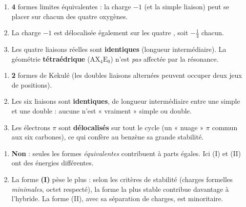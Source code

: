\documentclass[11pt,a4paper]{article}
\begin{document}
\newcommand{\AX}[2]{\ensuremath{\mathrm{AX_{#1}E_{#2}}}}
\begin{corrige}
\begin{enumerate}[label=\alph*)]
  \item \textbf{4} formes limites équivalentes : la charge $-1$ (et la simple liaison) peut se
        placer sur chacun des quatre oxygènes.
  \item La charge $-1$ est délocalisée également sur les quatre , soit $-\tfrac{1}{4}$ chacun.
  \item Les quatre liaisons  réelles sont \textbf{identiques} (longueur intermédiaire).
        La géométrie \textbf{tétraédrique} (\AX{4}{0}) n'est \emph{pas} affectée par la résonance.
\end{enumerate}
\end{corrige}

\begin{corrige}[le benzène \ce{C6H6}]
\begin{enumerate}[label=\alph*)]
  \item \textbf{2} formes de Kekulé (les doubles liaisons alternées peuvent occuper deux jeux de
        positions).
  \item Les six liaisons  sont \textbf{identiques}, de longueur intermédiaire entre une
        simple et une double : aucune n'est « vraiment » simple ou double.
  \item Les électrons $\pi$ sont \textbf{délocalisés} sur tout le cycle (un « nuage » $\pi$ commun
        aux six carbones), ce qui confère au benzène sa grande stabilité.
\end{enumerate}
\end{corrige}

\begin{corrige}
\begin{enumerate}[label=\alph*)]
  \item \textbf{Non} : seules les formes \emph{équivalentes} contribuent à parts égales. Ici (I)
        et (II) ont des énergies différentes.
  \item La forme \textbf{(I)} pèse le plus : selon les critères de stabilité (charges formelles
        \emph{minimales}, octet respecté), la forme la plus stable contribue davantage à l'hybride.
        La forme (II), avec sa séparation de charges, est minoritaire.
\end{enumerate}
\end{corrige}
\end{document}

